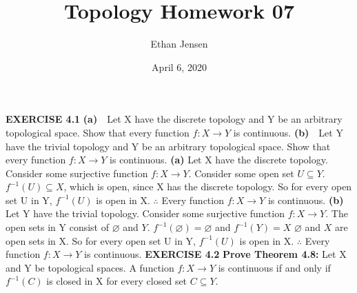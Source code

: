 \documentclass[12pt]{article}
\title{Topology Homework 07}
\author{Ethan Jensen}
\date{April 6, 2020}
\begin{document}
  \maketitle
  \noindent
  \textbf{EXERCISE 4.1}
  \newline
  \textbf{(a)}\ \ Let X have the discrete topology and Y be an arbitrary topological space.
  \newline Show that every function \(f:X\rightarrow Y\) is continuous.
  \newline
  \textbf{(b)}\ \ Let Y have the trivial topology and Y be an arbitrary topological space.
  \newline Show that every function \(f:X\rightarrow Y\) is continuous.
  \newline \newline \newline
  \textbf{(a)} Let X have the discrete topology.
  \newline
  Consider some surjective function \(f:X \rightarrow Y\).
  \newline
  Consider some open set \(U \subseteq Y\).
  \newline \newline
  \(f^{-1}(U) \subseteq X\), which is open, since X has the discrete topology.
  \newline
  So for every open set U in Y, \(f^{-1}(U)\) is open in X.
  \newline
  \(\therefore\) Every function \(f:X\rightarrow Y\) is continuous.
  \newline \newline
  \textbf{(b)} Let Y have the trivial topology.
  \newline
  Consider some surjective function \(f:X \rightarrow Y\).
  \newline
  The open sets in Y consist of \(\varnothing\) and \(Y\).
  \newline \newline
  \(f^{-1}(\varnothing) = \varnothing\) and \(f^{-1}(Y) = X\)
  \newline
  \(\varnothing\) and \(X\) are open sets in X.
  \newline
  So for every open set U in Y, \(f^{-1}(U)\) is open in X.
  \newline
  \(\therefore\) Every function \(f:X\rightarrow Y\) is continuous.
  \newpage
  \noindent
  \textbf{EXERCISE 4.2}
  \newline
  \textbf{Prove Theorem 4.8:} Let X and Y be topological spaces. A function \(f:X \rightarrow Y\) is continuous if and only if \(f^{-1}(C)\) is closed in X for every closed set \(C \subseteq Y\).
\end{document}
